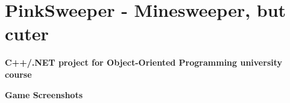 \chapter{Pink\+Sweeper -\/ Minesweeper, but cuter}
\hypertarget{md__c_1_2_users_2_vily_2source_2repos_2_mine_sweeper_2_r_e_a_d_m_e}{}\label{md__c_1_2_users_2_vily_2source_2repos_2_mine_sweeper_2_r_e_a_d_m_e}
\label{md__c_1_2_users_2_vily_2source_2repos_2_mine_sweeper_2_r_e_a_d_m_e_autotoc_md0}%
%
 {\bfseries{C++/.NET project for Object-\/\+Oriented Programming university course}}

{\bfseries{Game Screenshots}}



 